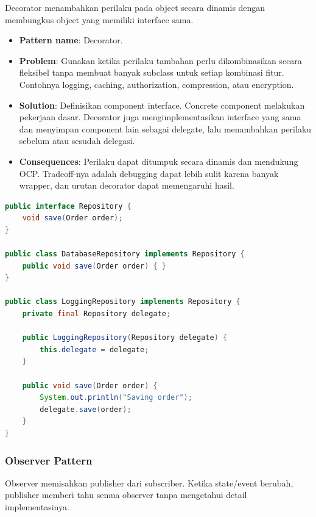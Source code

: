 \begin{jawab}
Decorator menambahkan perilaku pada object secara dinamis dengan membungkus object yang memiliki interface sama.
\end{jawab}

\begin{itemize}
    \item \textbf{Pattern name}: Decorator.
    \item \textbf{Problem}: Gunakan ketika perilaku tambahan perlu dikombinasikan secara fleksibel tanpa membuat banyak subclass untuk setiap kombinasi fitur. Contohnya logging, caching, authorization, compression, atau encryption.
    \item \textbf{Solution}: Definisikan component interface. Concrete component melakukan pekerjaan dasar. Decorator juga mengimplementasikan interface yang sama dan menyimpan component lain sebagai delegate, lalu menambahkan perilaku sebelum atau sesudah delegasi.
    \item \textbf{Consequences}: Perilaku dapat ditumpuk secara dinamis dan mendukung OCP. Tradeoff-nya adalah debugging dapat lebih sulit karena banyak wrapper, dan urutan decorator dapat memengaruhi hasil.
\end{itemize}

\begin{lstlisting}[language=Java, caption={Decorator Pattern untuk logging}, label={lst:decorator-pattern}]
public interface Repository {
    void save(Order order);
}

public class DatabaseRepository implements Repository {
    public void save(Order order) { }
}

public class LoggingRepository implements Repository {
    private final Repository delegate;

    public LoggingRepository(Repository delegate) {
        this.delegate = delegate;
    }

    public void save(Order order) {
        System.out.println("Saving order");
        delegate.save(order);
    }
}
\end{lstlisting}

\subsubsection{Observer Pattern}

\begin{jawab}
Observer memisahkan publisher dari subscriber. Ketika state/event berubah, publisher memberi tahu semua observer tanpa mengetahui detail implementasinya.
\end{jawab}

